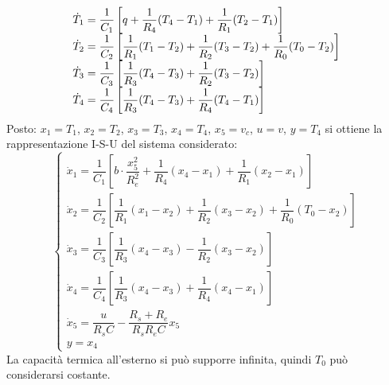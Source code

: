 \documentclass[a4paper]{report}
\begin{document}
\[
  \begin{array}{l}
    \dot{T}_1 = \dfrac{1}{C_1} \left[ q + \dfrac{1}{R_4}(T_4 - T_1) +
      \dfrac{1}{R_1}(T_2 - T_1)  \right]\\
    \dot{T}_2 = \dfrac{1}{C_2} \left[ \dfrac{1}{R_1}(T_1 - T_2) +
      \dfrac{1}{R_2}(T_3 - T_2) + \dfrac{1}{R_0}(T_0 - T_2) \right]\\
    \dot{T}_3 = \dfrac{1}{C_3} \left[ \dfrac{1}{R_3}(T_4 - T_3) +
      \dfrac{1}{R_2}(T_3 - T_2)  \right]\\
    \dot{T}_4 = \dfrac{1}{C_4} \left[ \dfrac{1}{R_3}(T_4 - T_3) +
      \dfrac{1}{R_4}(T_4 - T_1)  \right]\\
  \end{array}\\
\]
Posto:
$x_1 = T_1$, $x_2 = T_2$, $x_3 = T_3$, $x_4 = T_4$, $x_5 = v_c$, $u =
v$, $y = T_4$ si ottiene la rappresentazione I-S-U del sistema
considerato:
\[
  \left\{
  \begin{array}{l}
    \dot{x}_1 = \dfrac{1}{C_1} \left[ b \cdot \dfrac{x_5^2}{R_e^2} +
      \dfrac{1}{R_4}(x_4 - x_1) + \dfrac{1}{R_1}(x_2 - x_1) \right]\\
    \dot{x}_2 = \dfrac{1}{C_2} \left[ \dfrac{1}{R_1}(x_1 - x_2) +
      \dfrac{1}{R_2}(x_3 -x_2) + \dfrac{1}{R_0} (T_0 - x_2)  \right]\\
    \dot{x}_3 = \dfrac{1}{C_3} \left[ \dfrac{1}{R_3}(x_4 - x_3) -
      \dfrac{1}{R_2}(x_3 - x_2) \right]\\
    \dot{x}_4 = \dfrac{1}{C_4} \left[ \dfrac{1}{R_3}(x_4 - x_3) +
      \dfrac{1}{R_4}(x_4 - x_1) \right]\\
    \dot{x}_5 = \dfrac{u}{R_s C} - \dfrac{R_s + R_e}{R_s R_e C}x_5\\
    y = x_4
  \end{array}
  \right .
\]
La capacit\`a termica all'esterno si pu\`o supporre infinita,
quindi $T_0$ pu\`o considerarsi costante.
\end{document}
